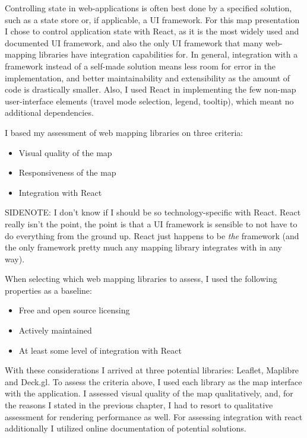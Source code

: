Controlling state in web-applications is often best done by a specified solution,
such as a state store or, if applicable, a UI framework.
For this map presentation I chose to control application state with React,
as it is the most widely used and documented UI framework,
and also the only UI framework that many web-mapping libraries have integration capabilities for.
In general, integration with a framework instead of a self-made solution
means less room for error in the implementation,
and better maintainability and extensibility as the amount of code is drastically smaller.
Also, I used React in implementing the few non-map user-interface elements
(travel mode selection, legend, tooltip),
which meant no additional dependencies.

I based my assessment of web mapping libraries on three criteria:
\begin{itemize}
	\item Visual quality of the map
	\item Responsiveness of the map
	\item Integration with React
\end{itemize}

SIDENOTE: I don't know if I should be so technology-specific with React.
React really isn't the point, the point is that a UI framework is sensible
to not have to do everything from the ground up. React just happens to
be \textit{the} framework
(and the only framework pretty much any mapping library integrates with in any way).

When selecting which web mapping libraries to assess, I used the following properties as a baseline:
\begin{itemize}
	\item Free and open source licensing
	\item Actively maintained
	\item At least some level of integration with React
\end{itemize}

With these considerations I arrived at three potential libraries:
Leaflet, Maplibre and Deck.gl.
To assess the criteria above,
I used each library as the map interface with the application.
I assessed visual quality of the map qualitatively, and, for the reasons I stated in the previous chapter,
I had to resort to qualitative assessment for rendering performance as well.
For assessing integration with react additionally I utilized online documentation of potential solutions.



